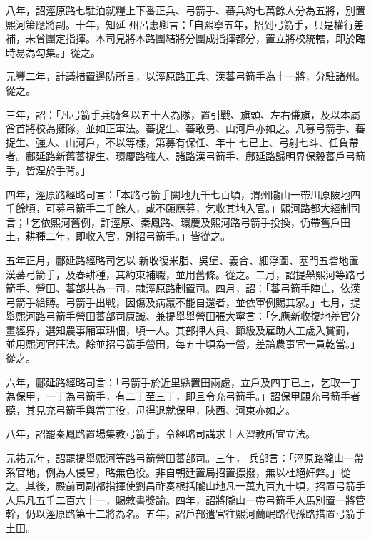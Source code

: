 \begin{pinyinscope}
 八年，詔涇原路七駐泊就糧上下番正兵、弓箭手、蕃兵約七萬餘人分為五將，別置熙河策應將副。十年，知延
 州呂惠卿言：「自熙寧五年，招到弓箭手，只是權行差補，未曾團定指揮。本司見將本路團結將分團成指揮都分，置立將校統轄，即於臨時易為勾集。」從之。



 元豐二年，計議措置邊防所言，以涇原路正兵、漢蕃弓箭手為十一將，分駐諸州。從之。



 三年，詔：「凡弓箭手兵騎各以五十人為隊，置引戰、旗頭、左右傔旗，及以本屬酋首將校為擁隊，並如正軍法。蕃捉生、蕃敢勇、山河戶亦如之。凡募弓箭手、蕃捉生、強人、山河戶，不以等樣，第募有保任、年十
 七已上、弓射七斗、任負帶者。鄜延路新舊蕃捉生、環慶路強人、諸路漢弓箭手、鄜延路歸明界保毅蕃戶弓箭手，皆涅於手背。」



 四年，涇原路經略司言：「本路弓箭手闕地九千七百頃，渭州隴山一帶川原陂地四千餘頃，可募弓箭手二千餘人，或不願應募，乞收其地入官。」熙河路都大經制司言；「乞依熙河舊例，許涇原、秦鳳路、環慶及熙河路弓箭手投換，仍帶舊戶田土，耕種二年，即收入官，別招弓箭手。」皆從之。



 五年正月，鄜延路經略司乞以
 新收復米脂、吳堡、義合、細浮圖、塞門五砦地置漢蕃弓箭手，及春耕種，其約束補職，並用舊條。從之。二月，詔提舉熙河等路弓箭手、營田、蕃部共為一司，隸涇原路制置司。四月，詔：「蕃弓箭手陣亡，依漢弓箭手給賻。弓箭手出戰，因傷及病羸不能自還者，並依軍例賜其家。」七月，提舉熙河路弓箭手營田蕃部司康識、兼提舉舉營田張大寧言：「乞應新收復地差官分畫經界，選知農事廂軍耕佃，頃一人。其部押人員、節級及雇助人工歲入賞罰，
 並用熙河官莊法。餘並招弓箭手營田，每五十頃為一營，差諳農事官一員乾當。」從之。



 六年，鄜延路經略司言：「弓箭手於近里縣置田兩處，立戶及四丁已上，乞取一丁為保甲，一丁為弓箭手，有二丁至三丁，即且令充弓箭手。」詔保甲願充弓箭手者聽，其見充弓箭手與當丁役，毋得退就保甲，陜西、河東亦如之。



 八年，詔罷秦鳳路置場集教弓箭手，令經略司講求土人習教所宜立法。



 元祐元年，詔罷提舉熙河等路弓箭營田蕃部司。三年，
 兵部言：「涇原路隴山一帶系官地，例為人侵冒，略無色役。非自朝廷置局招置摽撥，無以杜絕奸弊。」從之。其後，殿前司副都指揮使劉昌祚奏根括隴山地凡一萬九百九十頃，招置弓箭手人馬凡五千二百六十一，賜敕書獎諭。四年，詔將隴山一帶弓箭手人馬別置一將管幹，仍以涇原路第十二將為名。五年，詔戶部遣官往熙河蘭岷路代孫路措置弓箭手土田。




\end{pinyinscope}
